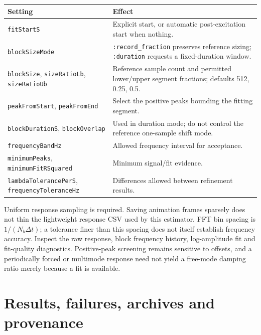 \documentclass[11pt,a4paper]{article}
\newcommand{\code}{\nolinkurl}
\begin{document}
\begin{longtable}{@{}L{.33\linewidth}L{.59\linewidth}@{}}
\toprule Setting & Effect\\\midrule\endhead
\code{fitStartS} & Explicit start, or automatic post-excitation start when nothing.\\
\code{blockSizeMode} & \code{:record_fraction} preserves reference sizing; \code{:duration} requests a fixed-duration window.\\
\code{blockSize}, \code{sizeRatioLb}, \code{sizeRatioUb} & Reference sample count and permitted lower/upper segment fractions; defaults 512, 0.25, 0.5.\\
\code{peakFromStart}, \code{peakFromEnd} & Select the positive peaks bounding the fitting segment.\\
\code{blockDurationS}, \code{blockOverlap} & Used in duration mode; do not control the reference one-sample shift mode.\\
\code{frequencyBandHz} & Allowed frequency interval for acceptance.\\
\code{minimumPeaks}, \code{minimumFitRSquared} & Minimum signal/fit evidence.\\
\code{lambdaTolerancePerS}, \code{frequencyToleranceHz} & Differences allowed between refinement results.\\
\bottomrule
\end{longtable}

Uniform response sampling is required. Saving animation frames sparsely does
not thin the lightweight response CSV used by this estimator. FFT bin spacing
is $1/(N_b\Delta t)$; a tolerance finer than this spacing does not itself
establish frequency accuracy. Inspect the raw response, block frequency history,
log-amplitude fit and fit-quality diagnostics. Positive-peak screening remains
sensitive to offsets, and a periodically forced or multimode response need not
yield a free-mode damping ratio merely because a fit is available.

\section{Results, failures, archives and provenance}
\end{document}
